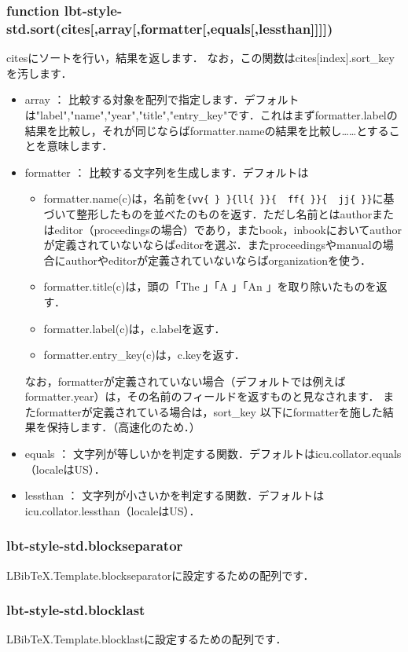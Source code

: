 \documentclass[dvipdfmx,a4paper]{jsarticle}
\begin{document}
\subsubsection{function lbt-style-std.sort(cites[,array[,formatter[,equals[,lessthan]]]])}
citesにソートを行い，結果を返します．
なお，この関数はcites[index].sort\_keyを汚します．
\begin{itemize}
\item array ： 比較する対象を配列で指定します．デフォルトは{"label","name","year","title","entry\_key"}です．これはまずformatter.labelの結果を比較し，それが同じならばformatter.nameの結果を比較し……とすることを意味します．
\item formatter ： 比較する文字列を生成します．デフォルトは
\begin{itemize}
\item formatter.name(c)は，名前を\verb|{vv{ } }{ll{ }}{  ff{ }}{  jj{ }}|に基づいて整形したものを並べたのものを返す．ただし名前とはauthorまたはeditor（proceedingsの場合）であり，またbook，inbookにおいてauthorが定義されていないならばeditorを選ぶ．またproceedingsやmanualの場合にauthorやeditorが定義されていないならばorganizationを使う．
\item formatter.title(c)は，頭の「The 」「A 」「An 」を取り除いたものを返す．
\item formatter.label(c)は，c.labelを返す．
\item formatter.entry\_key(c)は，c.keyを返す．
\end{itemize}
なお，formatterが定義されていない場合（デフォルトでは例えばformatter.year）は，その名前のフィールドを返すものと見なされます．
またformatterが定義されている場合は，sort\_key 以下にformatterを施した結果を保持します．（高速化のため．）
\item equals ： 文字列が等しいかを判定する関数．デフォルトはicu.collator.equals（localeはUS）．
\item lessthan ： 文字列が小さいかを判定する関数．デフォルトはicu.collator.lessthan（localeはUS）．
\end{itemize}

\subsubsection{lbt-style-std.blockseparator}
LBibTeX.Template.blockseparatorに設定するための配列です．

\subsubsection{lbt-style-std.blocklast}
LBibTeX.Template.blocklastに設定するための配列です．
\end{document}
